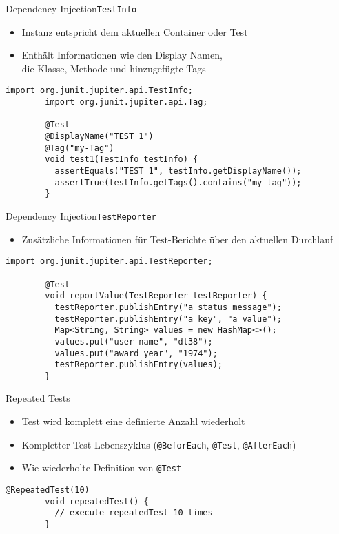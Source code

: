 \documentclass[utf8,t,aspectratio=169]{beamer}
\begin{document}
    \begin{frame}[fragile]{Dependency Injection}{\lstinline|TestInfo|}
      \begin{itemize}
          \item Instanz entspricht dem aktuellen Container oder Test
          \item Enthält Informationen wie den Display Namen,\\
            die Klasse, Methode und hinzugefügte Tags
      \end{itemize}
      \begin{lstlisting}[gobble=8]
        import org.junit.jupiter.api.TestInfo;
        import org.junit.jupiter.api.Tag;

        @Test
        @DisplayName("TEST 1")
        @Tag("my-Tag")
        void test1(TestInfo testInfo) {
          assertEquals("TEST 1", testInfo.getDisplayName());
          assertTrue(testInfo.getTags().contains("my-tag"));
        }
      \end{lstlisting}
    \end{frame}
    \begin{frame}[fragile]{Dependency Injection}{\lstinline|TestReporter|}
      \begin{itemize}
          \item Zusätzliche Informationen für Test-Berichte über den
            aktuellen Durchlauf
      \end{itemize}
      \begin{lstlisting}[gobble=8]
        import org.junit.jupiter.api.TestReporter;

        @Test
        void reportValue(TestReporter testReporter) {
          testReporter.publishEntry("a status message");
          testReporter.publishEntry("a key", "a value");
          Map<String, String> values = new HashMap<>();
          values.put("user name", "dl38");
          values.put("award year", "1974");
          testReporter.publishEntry(values);
        }
      \end{lstlisting}
    \end{frame}
    \begin{frame}[fragile]{Repeated Tests}
      \begin{itemize}
        \item Test wird komplett eine definierte Anzahl wiederholt
        \item Kompletter Test-Lebenszyklus (\lstinline|@BeforEach|,
          \lstinline|@Test|, \lstinline|@AfterEach|)
        \item Wie wiederholte Definition von \lstinline|@Test|
      \end{itemize}
      \begin{lstlisting}[gobble=8]
        @RepeatedTest(10) 
        void repeatedTest() {
          // execute repeatedTest 10 times
        }
      \end{lstlisting}
    \end{frame}
\end{document}

